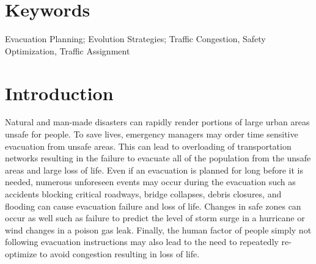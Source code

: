 \documentclass{sig-alternate-05-2015}
\begin{document}
\maketitle
\frenchspacing %

\begin{abstract}
In an urban disaster it is important to efficiently evacuate people to
safety.  We use evolution strategies and a probability model to route
the population by optimizing their safety.  The algorithm is designed
to use the strengths of evolutionary computing to repeatedly optimize
an evacuation under the dynamics of a disaster such as accidents
blocking critical roadways, bridge collapses, debris closures, changes
in safety, and people not following evacuation directions.  Our model
is unconcerned with specific evacuation routes but rather evolves a
robust cloud of probabilities to represent best directions of escape.
We show that maintaining a population of diverse solutions may allow
for rapid adaptation as a disaster unfolds.  The core optimization
algorithm is tested using challenging test cases as well as real-world
data.
\end{abstract}
\section*{Keywords}
Evacuation Planning; Evolution Strategies; Traffic
Congestion, Safety Optimization, Traffic Assignment

\section{Introduction}
Natural and man-made disasters can rapidly render portions of large
urban areas unsafe for people.  To save lives, emergency managers may
order time sensitive evacuation from unsafe areas.  This can lead to
overloading of transportation networks resulting in the failure to
evacuate all of the population from the unsafe areas and large loss of
life.  Even if an evacuation is planned for long before it is needed,
numerous unforeseen events may occur during the evacuation such as
accidents blocking critical roadways, bridge collapses, debris
closures, and flooding can cause evacuation failure and loss of life.
Changes in safe zones can occur as well such as failure to predict the
level of storm surge in a hurricane or wind changes in a poison gas
leak.  Finally, the human factor of people simply not following
evacuation instructions may also lead to the need to repeatedly
re-optimize to avoid congestion resulting in loss of life.
\end{document}
